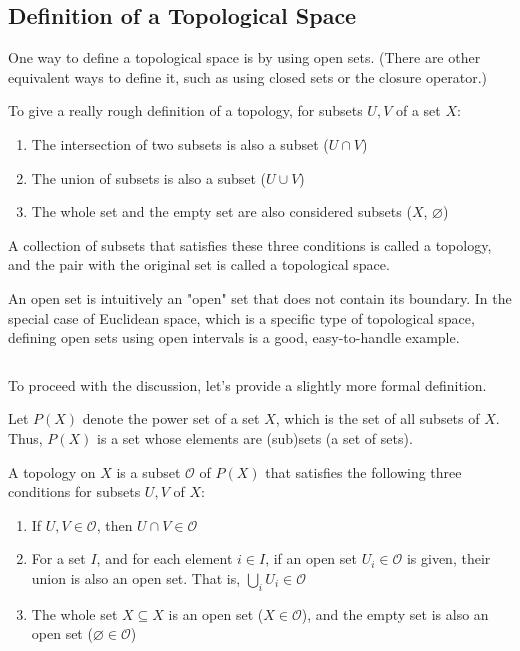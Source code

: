 \documentclass[article,letterpaper,12pt]{jsarticle}
\begin{document}
\subsection{Definition of a Topological Space}

One way to define a topological space is by using open sets.
(There are other equivalent ways to define it, such as using closed sets or the closure operator.)

To give a really rough definition of a topology, for subsets $U,V$ of a set $X$:

\begin{enumerate}
	\item The intersection of two subsets is also a subset ($U \cap V$)
	\item The union of subsets is also a subset ($U \cup V$)
	\item The whole set and the empty set are also considered subsets ($X$, $\varnothing$)
\end{enumerate}

A collection of subsets that satisfies these three conditions is called a topology, and the pair with the original set is called a topological space.

An open set is intuitively an "open" set that does not contain its boundary. In the special case of Euclidean space, which is a specific type of topological space, defining open sets using open intervals is a good, easy-to-handle example.

${}$

To proceed with the discussion, let's provide a slightly more formal definition.

Let $P(X)$ denote the power set of a set $X$, which is the set of all subsets of $X$.
Thus, $P(X)$ is a set whose elements are (sub)sets (a set of sets).

A topology on $X$ is a subset $\mathcal{O}$ of $P(X)$ that satisfies the following three conditions for subsets $U,V$ of $X$:
\begin{enumerate}
	\item If $U,V \in {\mathcal O}$, then $U \cap V \in {\mathcal O}$
	\item For a set $I$, and for each element $i \in I$, if an open set $U_{i} \in {\mathcal O}$ is given,
	      their union is also an open set. That is, $\bigcup_{i} U_{i} \in {\mathcal O}$
	\item The whole set $X \subseteq X$ is an open set ($X \in {\mathcal O}$), and the empty set is also an open set ($\varnothing \in {\mathcal O}$)
\end{enumerate}
\end{document}
